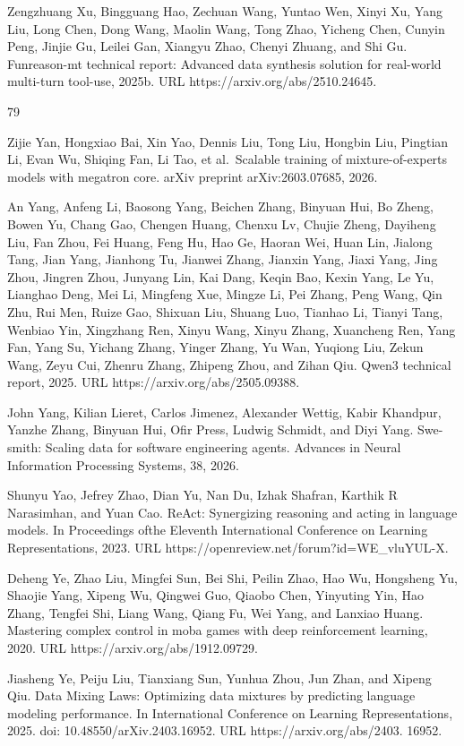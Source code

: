\documentclass[
  10
]{article}
\begin{document}
Zengzhuang Xu, Bingguang Hao, Zechuan Wang, Yuntao Wen, Xinyi Xu, Yang
Liu, Long Chen, Dong Wang, Maolin Wang, Tong Zhao, Yicheng Chen, Cunyin
Peng, Jinjie Gu, Leilei Gan, Xiangyu Zhao, Chenyi Zhuang, and Shi Gu.
Funreason-mt technical report: Advanced data synthesis solution for
real-world multi-turn tool-use, 2025b. URL
https://arxiv.org/abs/2510.24645.

79

Zijie Yan, Hongxiao Bai, Xin Yao, Dennis Liu, Tong Liu, Hongbin Liu,
Pingtian Li, Evan Wu, Shiqing Fan, Li Tao, et al.~Scalable training of
mixture-of-experts models with megatron core. arXiv preprint
arXiv:2603.07685, 2026.

An Yang, Anfeng Li, Baosong Yang, Beichen Zhang, Binyuan Hui, Bo Zheng,
Bowen Yu, Chang Gao, Chengen Huang, Chenxu Lv, Chujie Zheng, Dayiheng
Liu, Fan Zhou, Fei Huang, Feng Hu, Hao Ge, Haoran Wei, Huan Lin, Jialong
Tang, Jian Yang, Jianhong Tu, Jianwei Zhang, Jianxin Yang, Jiaxi Yang,
Jing Zhou, Jingren Zhou, Junyang Lin, Kai Dang, Keqin Bao, Kexin Yang,
Le Yu, Lianghao Deng, Mei Li, Mingfeng Xue, Mingze Li, Pei Zhang, Peng
Wang, Qin Zhu, Rui Men, Ruize Gao, Shixuan Liu, Shuang Luo, Tianhao Li,
Tianyi Tang, Wenbiao Yin, Xingzhang Ren, Xinyu Wang, Xinyu Zhang,
Xuancheng Ren, Yang Fan, Yang Su, Yichang Zhang, Yinger Zhang, Yu Wan,
Yuqiong Liu, Zekun Wang, Zeyu Cui, Zhenru Zhang, Zhipeng Zhou, and Zihan
Qiu. Qwen3 technical report, 2025. URL https://arxiv.org/abs/2505.09388.

John Yang, Kilian Lieret, Carlos Jimenez, Alexander Wettig, Kabir
Khandpur, Yanzhe Zhang, Binyuan Hui, Ofir Press, Ludwig Schmidt, and
Diyi Yang. Swe-smith: Scaling data for software engineering agents.
Advances in Neural Information Processing Systems, 38, 2026.

Shunyu Yao, Jefrey Zhao, Dian Yu, Nan Du, Izhak Shafran, Karthik R
Narasimhan, and Yuan Cao. ReAct: Synergizing reasoning and acting in
language models. In Proceedings ofthe Eleventh International Conference
on Learning Representations, 2023. URL
https://openreview.net/forum?id=WE\_vluYUL-X.

Deheng Ye, Zhao Liu, Mingfei Sun, Bei Shi, Peilin Zhao, Hao Wu,
Hongsheng Yu, Shaojie Yang, Xipeng Wu, Qingwei Guo, Qiaobo Chen,
Yinyuting Yin, Hao Zhang, Tengfei Shi, Liang Wang, Qiang Fu, Wei Yang,
and Lanxiao Huang. Mastering complex control in moba games with deep
reinforcement learning, 2020. URL https://arxiv.org/abs/1912.09729.

Jiasheng Ye, Peiju Liu, Tianxiang Sun, Yunhua Zhou, Jun Zhan, and Xipeng
Qiu. Data Mixing Laws: Optimizing data mixtures by predicting language
modeling performance. In International Conference on Learning
Representations, 2025. doi: 10.48550/arXiv.2403.16952. URL
https://arxiv.org/abs/2403. 16952.
\end{document}
